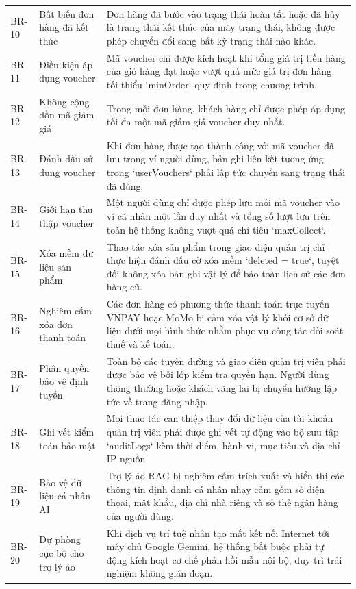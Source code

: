\begin{table}[H]
\begin{tabularx}{\textwidth}{p{2cm}p{3.8cm}X}
\addlinespace
BR-10 & Bất biến đơn hàng đã kết thúc & Đơn hàng đã bước vào trạng thái hoàn tất hoặc đã hủy là trạng thái kết thúc của máy trạng thái, không được phép chuyển đổi sang bất kỳ trạng thái nào khác. \\
\addlinespace
BR-11 & Điều kiện áp dụng voucher & Mã voucher chỉ được kích hoạt khi tổng giá trị tiền hàng của giỏ hàng đạt hoặc vượt quá mức giá trị đơn hàng tối thiểu `minOrder` quy định trong chương trình. \\
\addlinespace
BR-12 & Không cộng dồn mã giảm giá & Trong mỗi đơn hàng, khách hàng chỉ được phép áp dụng tối đa một mã giảm giá voucher duy nhất. \\
\addlinespace
BR-13 & Đánh dấu sử dụng voucher & Khi đơn hàng được tạo thành công với mã voucher đã lưu trong ví người dùng, bản ghi liên kết tương ứng trong `userVouchers` phải lập tức chuyển sang trạng thái đã dùng. \\
\addlinespace
BR-14 & Giới hạn thu thập voucher & Một người dùng chỉ được phép lưu mỗi mã voucher vào ví cá nhân một lần duy nhất và tổng số lượt lưu trên toàn hệ thống không vượt quá chỉ tiêu `maxCollect`. \\
\addlinespace
BR-15 & Xóa mềm dữ liệu sản phẩm & Thao tác xóa sản phẩm trong giao diện quản trị chỉ thực hiện đánh dấu cờ xóa mềm `deleted = true`, tuyệt đối không xóa bản ghi vật lý để bảo toàn lịch sử các đơn hàng cũ. \\
\addlinespace
BR-16 & Nghiêm cấm xóa đơn thanh toán & Các đơn hàng có phương thức thanh toán trực tuyến VNPAY hoặc MoMo bị cấm xóa vật lý khỏi cơ sở dữ liệu dưới mọi hình thức nhằm phục vụ công tác đối soát thuế và kế toán. \\
\addlinespace
BR-17 & Phân quyền bảo vệ định tuyến & Toàn bộ các tuyến đường và giao diện quản trị viên phải được bảo vệ bởi lớp kiểm tra quyền hạn. Người dùng thông thường hoặc khách vãng lai bị chuyển hướng lập tức về trang đăng nhập. \\
\addlinespace
BR-18 & Ghi vết kiểm toán bảo mật & Mọi thao tác can thiệp thay đổi dữ liệu của tài khoản quản trị viên phải được ghi vết tự động vào bộ sưu tập `auditLogs` kèm thời điểm, hành vi, mục tiêu và địa chỉ IP nguồn. \\
\addlinespace
BR-19 & Bảo vệ dữ liệu cá nhân AI & Trợ lý ảo RAG bị nghiêm cấm trích xuất và hiển thị các thông tin định danh cá nhân nhạy cảm gồm số điện thoại, mật khẩu, địa chỉ nhà riêng và số thẻ ngân hàng của người dùng. \\
\addlinespace
BR-20 & Dự phòng cục bộ cho trợ lý ảo & Khi dịch vụ trí tuệ nhân tạo mất kết nối Internet tới máy chủ Google Gemini, hệ thống bắt buộc phải tự động kích hoạt cơ chế phản hồi mẫu nội bộ, duy trì trải nghiệm không gián đoạn. \\
\bottomrule
\end{tabularx}
\end{table}

